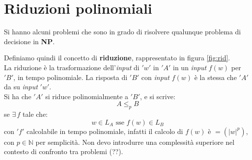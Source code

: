 						\section{Riduzioni polinomiali}
						Si hanno alcuni problemi che sono in grado di risolvere qualunque problema di
						decisione in \textbf{NP}.
						\begin{definizione}
							Definiamo quindi il concetto di \textbf{riduzione}, rappresentato in figura
							\ref{fig:rid}.\\
							La riduzione è la trasformazione dell'\textit{input} di $ 'w' $ in $ 'A' $ in un \textit{input} $f(w)$
							per $ 'B' $, in tempo polinomiale. La risposta di $ 'B' $ con \textit{input} $f(w)$ è la stessa
							che $ 'A' $ da su \textit{input} $ 'w' $.\\
							Si ha che $ 'A' $ si riduce polinomialmente a $ 'B' $, e si scrive:
							\[A\leq_p B\]
							se $\exists\,f$ tale che:
							\[w \in L_A\mbox{ sse } f(w)\in L_B\]
							con $ 'f' $ calcolabile in tempo polinomiale, infatti il calcolo di $f(w)$ è
							$=(|w|^p)$, con $p\in\mathbb{N}$ per semplicità. Non devo introdurre una
							complessità superiore nel contesto di confronto tra problemi (??).\\ 
							\begin{figure}
								\centering
								    

\end{figure}
\end{definizione}
